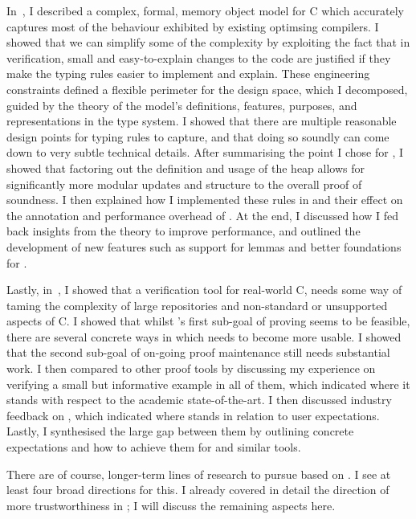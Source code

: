 In~, I described a complex, formal, memory object
model for C which accurately captures most of the behaviour exhibited by
existing optimsing compilers. I showed that we can simplify some of the
complexity by exploiting the fact that in verification, small and
easy-to-explain changes to the code are justified if they make the typing rules
easier to implement and explain. These engineering constraints defined a
flexible perimeter for the design space, which I decomposed, guided by the
theory of the model's definitions, features, purposes, and representations in
the  type system. I showed that there are multiple reasonable design
points for typing rules to capture, and that doing so soundly can come down to
very subtle technical details. After summarising the point I chose for
, I showed that factoring out the definition and usage of the heap
allows for significantly more modular updates and structure to the
overall proof of soundness. I then explained how I implemented these rules in
 and their effect on the annotation and performance overhead of .
At the end, I discussed how I fed back insights from the theory to improve performance,
and outlined the development of new features such as support for lemmas and
better foundations for .

Lastly, in~, I showed that a verification tool for
real-world C, needs some way of taming the complexity of large repositories and
non-standard or unsupported aspects of C. I showed that whilst 's first
sub-goal of proving  seems to be feasible, there are several concrete
ways in which needs to become more usable. I showed that the second sub-goal of
on-going proof maintenance still needs substantial work. I then compared
 to other proof tools by discussing my experience on verifying a small
but informative example in all of them, which indicated where it stands with
respect to the academic state-of-the-art. I then discussed industry feedback on
, which indicated where  stands in relation to user
expectations. Lastly, I synthesised the large gap between them by outlining
concrete expectations and how to achieve them for  and similar tools.

There are of course, longer-term lines of research to pursue based on .
I see at least four broad directions for this. I already covered in detail the
direction of more trustworthiness in ; I will
discuss the remaining aspects here.

